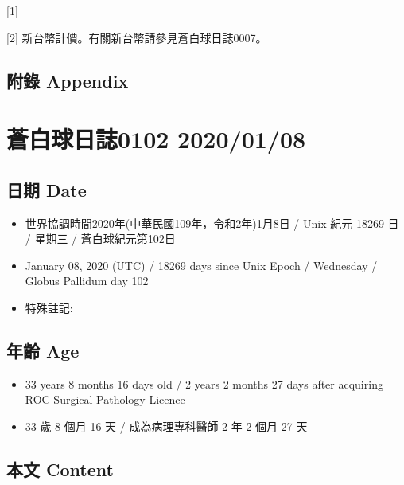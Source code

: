 \documentclass[
]{article}
\providecommand{\tightlist}{%
  \setlength{\itemsep}{0pt}\setlength{\parskip}{0pt}}
\begin{document}
{[}1{]}

{[}2{]} 新台幣計價。有關新台幣請參見蒼白球日誌0007。

\hypertarget{ux9644ux9304-appendix-37}{%
\subsection{附錄 Appendix}\label{ux9644ux9304-appendix-37}}

\hypertarget{ux84bcux767dux7403ux65e5ux8a8c0102-20200108}{%
\section{蒼白球日誌0102
2020/01/08}\label{ux84bcux767dux7403ux65e5ux8a8c0102-20200108}}

\hypertarget{ux65e5ux671f-date-38}{%
\subsection{日期 Date}\label{ux65e5ux671f-date-38}}

\begin{itemize}
\tightlist
\item
  世界協調時間2020年(中華民國109年，令和2年)1月8日 / Unix 紀元 18269 日
  / 星期三 / 蒼白球紀元第102日
\item
  January 08, 2020 (UTC) / 18269 days since Unix Epoch / Wednesday /
  Globus Pallidum day 102
\item
  特殊註記:
\end{itemize}

\hypertarget{ux5e74ux9f61-age-38}{%
\subsection{年齡 Age}\label{ux5e74ux9f61-age-38}}

\begin{itemize}
\tightlist
\item
  33 years 8 months 16 days old / 2 years 2 months 27 days after
  acquiring ROC Surgical Pathology Licence
\item
  33 歲 8 個月 16 天 / 成為病理專科醫師 2 年 2 個月 27 天
\end{itemize}

\hypertarget{ux672cux6587-content-38}{%
\subsection{本文 Content}\label{ux672cux6587-content-38}}
\end{document}
